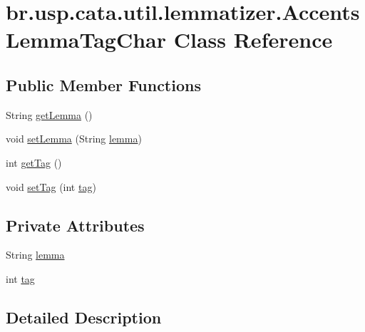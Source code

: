 \hypertarget{classbr_1_1usp_1_1cata_1_1util_1_1lemmatizer_1_1_accents_lemma_tag_char}{\section{br.\+usp.\+cata.\+util.\+lemmatizer.\+Accents\+Lemma\+Tag\+Char Class Reference}
\label{classbr_1_1usp_1_1cata_1_1util_1_1lemmatizer_1_1_accents_lemma_tag_char}
}
\subsection*{Public Member Functions}
\begin{DoxyCompactItemize}
\item 
String \hyperlink{classbr_1_1usp_1_1cata_1_1util_1_1lemmatizer_1_1_accents_lemma_tag_char_a2b8a0595cf55fc75220b80a297447cdc}{get\+Lemma} ()
\item 
void \hyperlink{classbr_1_1usp_1_1cata_1_1util_1_1lemmatizer_1_1_accents_lemma_tag_char_afd3de641ec5ecc3a689f2595dcb27a1f}{set\+Lemma} (String \hyperlink{classbr_1_1usp_1_1cata_1_1util_1_1lemmatizer_1_1_accents_lemma_tag_char_a99cdb5d25f2aca2c88d64c0a8c7d5b9f}{lemma})
\item 
int \hyperlink{classbr_1_1usp_1_1cata_1_1util_1_1lemmatizer_1_1_accents_lemma_tag_char_ac872b5bd633ba3a2ae8f7ce8bdd0039f}{get\+Tag} ()
\item 
void \hyperlink{classbr_1_1usp_1_1cata_1_1util_1_1lemmatizer_1_1_accents_lemma_tag_char_aaf951d2601d5d3bd38162ac1809fd747}{set\+Tag} (int \hyperlink{classbr_1_1usp_1_1cata_1_1util_1_1lemmatizer_1_1_accents_lemma_tag_char_a981cdf1906e4be8c3b8573851db24f26}{tag})
\end{DoxyCompactItemize}
\subsection*{Private Attributes}
\begin{DoxyCompactItemize}
\item 
String \hyperlink{classbr_1_1usp_1_1cata_1_1util_1_1lemmatizer_1_1_accents_lemma_tag_char_a99cdb5d25f2aca2c88d64c0a8c7d5b9f}{lemma}
\item 
int \hyperlink{classbr_1_1usp_1_1cata_1_1util_1_1lemmatizer_1_1_accents_lemma_tag_char_a981cdf1906e4be8c3b8573851db24f26}{tag}
\end{DoxyCompactItemize}


\subsection{Detailed Description}



